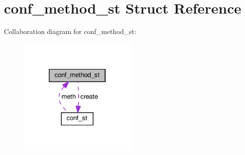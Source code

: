 \hypertarget{structconf__method__st}{}\section{conf\+\_\+method\+\_\+st Struct Reference}
\label{structconf__method__st}


Collaboration diagram for conf\+\_\+method\+\_\+st\+:
\nopagebreak
\begin{figure}[H]
\begin{center}
\leavevmode
\includegraphics[width=166pt]{structconf__method__st__coll__graph}
\end{center}
\end{figure}
